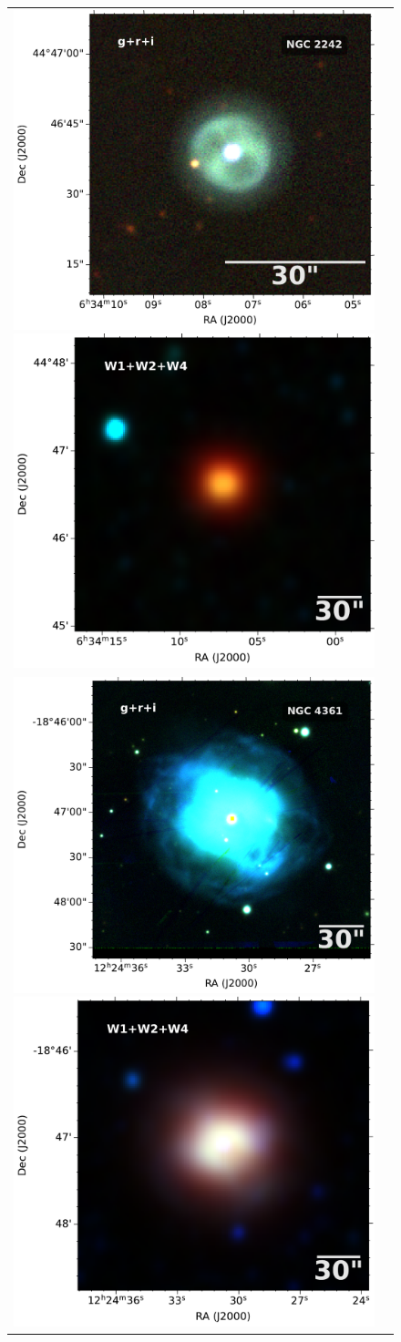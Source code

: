\documentclass[fleqn,usenatbib]{mnras}
\begin{document}
\begin{figure}
  \centering
  \begin{tabular}{l l}
\includegraphics[width=0.52\linewidth]{Figs/cutout_rings.v3.skycell.2243.029.stk.i.unconv-irg-RGB.pdf}
\includegraphics[width=0.5\linewidth]{Figs/0979p454_ac51-w4-int-3_ra98.53061791727998_dec44.77716333248_asec200.000-421-RGB.pdf}\\
\includegraphics[width=0.52\linewidth]{Figs/cutout_rings.v3.skycell.0924.030.stk.i.unconv-irg-RGB.pdf}
\includegraphics[width=0.5\linewidth]{Figs/1855m182_ac51-w4-int-3_ra186.12812938647002_dec-18.78487981564_asec200.000-421-RGB}\\

\end{tabular}
\end{figure}
\end{document}
